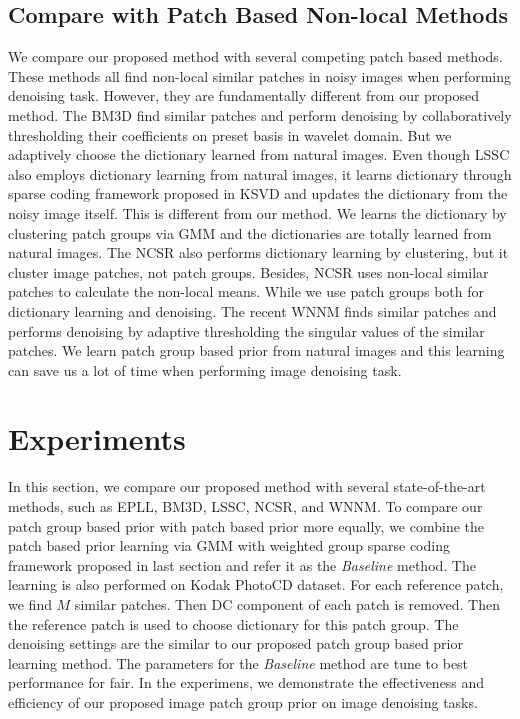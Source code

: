 \documentclass[10pt,twocolumn,letterpaper]{article}
\begin{document}
\subsection{Compare with Patch Based Non-local Methods}
We compare our proposed method with several competing patch based methods\cite{bm3d,lssc,ncsr,wnnm}. These methods all find non-local similar patches in noisy images when performing denoising task. However, they are fundamentally different from our proposed method. The BM3D find similar patches and perform denoising by collaboratively thresholding their coefficients on preset basis in wavelet domain. But we adaptively choose the dictionary learned from natural images. Even though LSSC also employs dictionary learning from natural images, it learns dictionary through sparse coding framework proposed in KSVD and updates the dictionary from the noisy image itself. This is different from our method. We learns the dictionary by clustering patch groups via GMM and the dictionaries are totally learned from natural images. The NCSR also performs dictionary learning by clustering, but it cluster image patches, not patch groups. Besides, NCSR uses non-local similar patches to calculate the non-local means. While we use patch groups both for dictionary learning and denoising. The recent WNNM finds similar patches and performs denoising by adaptive thresholding the singular values of the similar patches. We learn patch group based prior from natural images and this learning can save us a lot of time when performing image denoising task.
\section{Experiments}
In this section, we compare our proposed method with several state-of-the-art methods, such as EPLL\cite{epll}, BM3D\cite{bm3d}, LSSC\cite{lssc}, NCSR\cite{ncsr}, and WNNM\cite{wnnm}. To compare our patch group based prior with patch based prior more equally, we combine the patch based prior learning via GMM with weighted group sparse coding framework proposed in last section and refer it as the \textsl{Baseline} method. The learning is also performed on Kodak PhotoCD dataset. For each reference patch, we find $M$ similar patches. Then DC component of each patch is removed. Then the reference patch is used to choose dictionary for this patch group. The denoising settings are the similar to our proposed patch group based prior learning method. The parameters for the \textsl{Baseline} method are tune to best performance for fair. In the experimens, we demonstrate the effectiveness and efficiency of our proposed image patch group prior on image denoising tasks.
\end{document}
